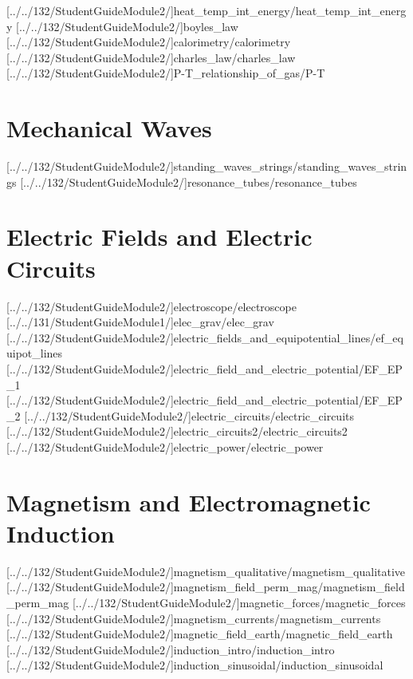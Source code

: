 \documentclass[english,twoside]{article}
\begin{document}
[../../132/StudentGuideModule2/]{heat_temp_int_energy/heat_temp_int_energy}
[../../132/StudentGuideModule2/]{boyles_law}
[../../132/StudentGuideModule2/]{calorimetry/calorimetry}
[../../132/StudentGuideModule2/]{charles_law/charles_law}
[../../132/StudentGuideModule2/]{P-T_relationship_of_gas/P-T}

\part{Mechanical Waves}
[../../132/StudentGuideModule2/]{standing_waves_strings/standing_waves_strings} %
[../../132/StudentGuideModule2/]{resonance_tubes/resonance_tubes} 

\part{Electric Fields and Electric Circuits}

[../../132/StudentGuideModule2/]{electroscope/electroscope}
[../../131/StudentGuideModule1/]{elec_grav/elec_grav}
[../../132/StudentGuideModule2/]{electric_fields_and_equipotential_lines/ef_equipot_lines}
[../../132/StudentGuideModule2/]{electric_field_and_electric_potential/EF_EP_1}
[../../132/StudentGuideModule2/]{electric_field_and_electric_potential/EF_EP_2}
[../../132/StudentGuideModule2/]{electric_circuits/electric_circuits}
[../../132/StudentGuideModule2/]{electric_circuits2/electric_circuits2}
[../../132/StudentGuideModule2/]{electric_power/electric_power}

\part{Magnetism and Electromagnetic Induction}

[../../132/StudentGuideModule2/]{magnetism_qualitative/magnetism_qualitative}
[../../132/StudentGuideModule2/]{magnetism_field_perm_mag/magnetism_field_perm_mag}
[../../132/StudentGuideModule2/]{magnetic_forces/magnetic_forces} 
[../../132/StudentGuideModule2/]{magnetism_currents/magnetism_currents} %
[../../132/StudentGuideModule2/]{magnetic_field_earth/magnetic_field_earth}
[../../132/StudentGuideModule2/]{induction_intro/induction_intro}
[../../132/StudentGuideModule2/]{induction_sinusoidal/induction_sinusoidal} %
\end{document}
